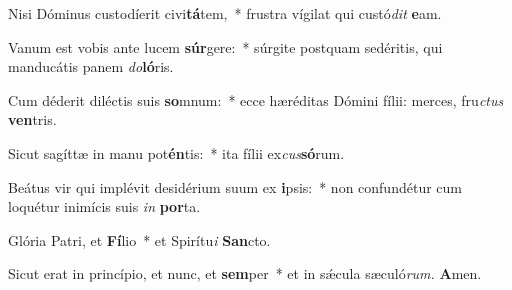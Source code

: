 \item Nisi Dóminus custodíerit civi\textbf{tá}tem,~* frustra vígilat qui custó\textit{dit} \textbf{e}am.
\item Vanum est vobis ante lucem \textbf{súr}gere:~* súrgite postquam sedéritis, qui manducátis panem \textit{do}\textbf{ló}ris.
\item Cum déderit diléctis suis \textbf{so}mnum:~* ecce hæréditas Dómini fílii: merces, fru\hspace{0.03em}\textit{ctus} \textbf{ven}tris.
\item Sicut sagíttæ in manu pot\textbf{én}tis:~* ita fílii ex\hspace{0.03em}\textit{cus}\textbf{só}rum.
\item Beátus vir qui implévit desidérium suum ex \textbf{i}psis:~* non confundétur cum loquétur inimícis suis \textit{in} \textbf{por}ta.
\item Glória Patri, et \textbf{Fí}lio~* et Spirítu\hspace{0.03em}\textit{i} \textbf{San}cto.
\item Sicut erat in princípio, et nunc, et \textbf{sem}per~* et in sǽcula sæculó\textit{rum.} \textbf{A}men.